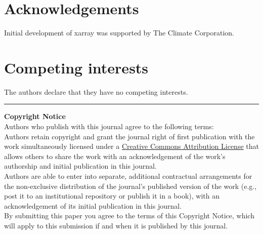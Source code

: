\documentclass{jors}
\begin{document}
\section*{Acknowledgements}

Initial development of xarray was supported by The Climate Corporation.

\section*{Competing interests}

The authors declare that they have no competing interests.



\vspace{2cm}

\rule{\textwidth}{1pt}

{ \bf Copyright Notice} \\
Authors who publish with this journal agree to the following terms: \\

Authors retain copyright and grant the journal right of first publication with the work simultaneously licensed under a  \href{http://creativecommons.org/licenses/by/3.0/}{Creative Commons Attribution License} that allows others to share the work with an acknowledgement of the work's authorship and initial publication in this journal. \\

Authors are able to enter into separate, additional contractual arrangements for the non-exclusive distribution of the journal's published version of the work (e.g., post it to an institutional repository or publish it in a book), with an acknowledgement of its initial publication in this journal. \\

By submitting this paper you agree to the terms of this Copyright Notice, which will apply to this submission if and when it is published by this journal.
\end{document}
